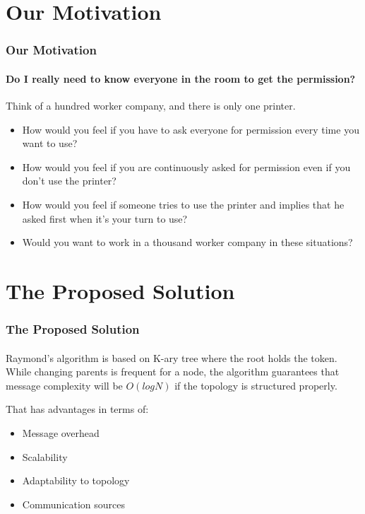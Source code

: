 \documentclass[11pt]{beamer}              %
\begin{document}
\section{Our Motivation}
\begin{frame}
\frametitle{Our Motivation}
\framesubtitle{Do I really need to know everyone in the room to get the permission?}
Think of a hundred worker company, and there is only one printer.
\begin{itemize}
    \item How would you feel if you have to ask everyone for permission every time you want to use?
    \item How would you feel if you are continuously asked for permission even if you don't use the printer?
    \item How would you feel if someone tries to use the printer and implies that he asked first when it's your turn to use?
    \item Would you want to work in a thousand worker company in these situations?
\end{itemize}
\end{frame}

\section{The Proposed Solution}
\begin{frame}
\frametitle{The Proposed Solution}
\framesubtitle{}

Raymond's algorithm is based on K-ary tree where the root holds the token. While changing parents is frequent for a node, the algorithm guarantees that message complexity will be $O(logN)$ if the topology is structured properly.

That has advantages in terms of:

\begin{itemize}
\item Message overhead
\item Scalability
\item Adaptability to topology
\item Communication sources
\end{itemize}

\end{frame}
\end{document}
